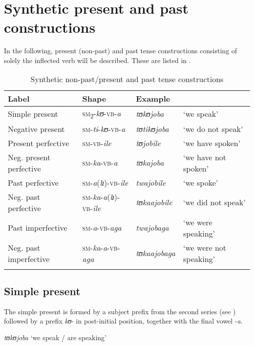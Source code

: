 \section{Synthetic present and past constructions} \label{SimpleConstructions}
In the following, present (non-past) and past tense constructions consisting of solely the inflected verb will be described. These are listed in .
\begin{table}[hh]
\setlength{\tabcolsep}{2pt}
\begin{tabularx}{\textwidth}{llll}
\lsptoprule
\footnotesize{Label} & \footnotesize{Shape} & \footnotesize{Example}\\
\midrule 
Simple present & \textsc{sm}\textsubscript{2}-\textit{kʊ}-\textsc{vb}-\textit{a} & \textit{tʊkʊjoba} & \lq we  speak' \\  
Negative present & \textsc{sm}-\textit{ti}-\textit{kʊ}-\textsc{vb}-\textit{a} &  \textit{tʊtikʊjoba} & \lq we do not speak'\\ 
Present perfective & \textsc{sm}-\textsc{vb}-\textit{ile} & \textit{tʊjobile} & \lq we have spoken'\\ 
Neg. present perfective & \textsc{sm}-\textit{ka}-\textsc{vb}-\textit{a} & \textit{tʊkajoba} & \lq we have not spoken'\\ 
Past perfective & \textsc{sm}-\textit{a}(\textit{lɪ})-\textsc{vb}-\textit{ile} & \textit{twajobile} & \lq we spoke' \\ 
Neg. past perfective & \textsc{sm}-\textit{ka}-\textit{a}(\textit{lɪ})-\textsc{vb}-\textit{ile} & \textit{tʊkaajobile} & \lq we did not speak' \\ 
Past imperfective & \textsc{sm}-\textit{a}-\textsc{vb}-\textit{aga} & \textit{twajobaga} & \lq we were speaking' \\ 
Neg. past imperfective & \textsc{sm}-\textit{ka}-\textit{a}-\textsc{vb}-\textit{aga} & \textit{tʊkaajobaga} & \lq we were not speaking' \\  
\lspbottomrule  
\end{tabularx}
\caption{Synthetic non-past/present and past tense constructions}\label{tableSimpleConstructions}
\end{table}
\subsection{Simple present}\label{Present}
The simple present is formed by a subject prefix from the second series (see ) followed by a prefix \textit{kʊ}- in post-initial position, together with the final vowel -\textit{a}.
\begin{exe}
\ex\textit{tʊkʊjoba} \lq we speak / are speaking'
\end{exe}

